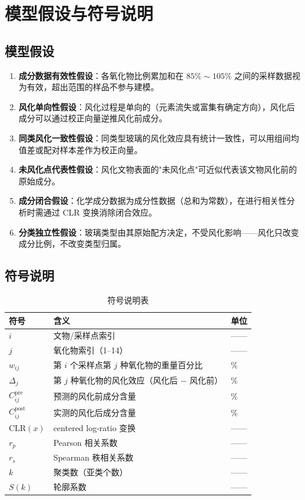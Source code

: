 \section{模型假设与符号说明}

\subsection{模型假设}

\begin{enumerate}[label=\arabic*.]
    \item \textbf{成分数据有效性假设}：各氧化物比例累加和在 $85\%\sim105\%$ 之间的采样数据视为有效，超出范围的样品不参与建模。
    \item \textbf{风化单向性假设}：风化过程是单向的（元素流失或富集有确定方向），风化后成分可以通过校正向量逆推风化前成分。
    \item \textbf{同类风化一致性假设}：同类型玻璃的风化效应具有统计一致性，可以用组间均值差或配对样本差作为校正向量。
    \item \textbf{未风化点代表性假设}：风化文物表面的"未风化点"可近似代表该文物风化前的原始成分。
    \item \textbf{成分闭合假设}：化学成分数据为成分性数据（总和为常数），在进行相关性分析时需通过 CLR 变换消除闭合效应。
    \item \textbf{分类独立性假设}：玻璃类型由其原始配方决定，不受风化影响——风化只改变成分比例，不改变类型归属。
\end{enumerate}

\subsection{符号说明}

\begin{table}[H]
    \centering
    \caption{符号说明表}
    \label{tab:symbols}
    \begin{tabular}{p{2cm} p{9cm} p{2cm}}
        \toprule
        \textbf{符号} & \textbf{含义} & \textbf{单位} \\
        \midrule
        $i$ & 文物/采样点索引 & —— \\
        $j$ & 氧化物索引（1--14） & —— \\
        $w_{ij}$ & 第 $i$ 个采样点第 $j$ 种氧化物的重量百分比 & \% \\
        $\Delta_j$ & 第 $j$ 种氧化物的风化效应（风化后 $-$ 风化前） & \% \\
        $C_{ij}^{\text{pre}}$ & 预测的风化前成分含量 & \% \\
        $C_{ij}^{\text{post}}$ & 实测的风化后成分含量 & \% \\
        $\text{CLR}(x)$ & centered log-ratio 变换 & —— \\
        $r_p$ & Pearson 相关系数 & —— \\
        $r_s$ & Spearman 秩相关系数 & —— \\
        $k$ & 聚类数（亚类个数） & —— \\
        $S(k)$ & 轮廓系数 & —— \\
        \bottomrule
    \end{tabular}
\end{table}
